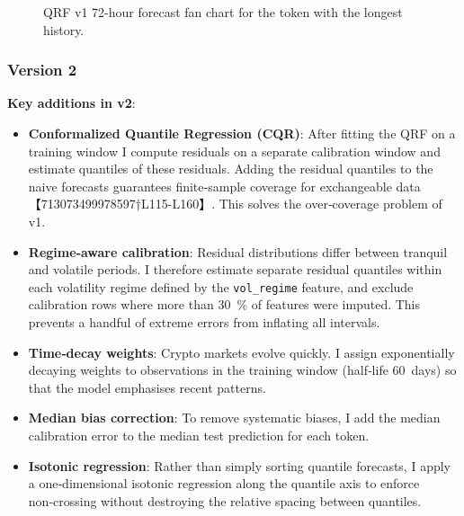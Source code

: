 \documentclass[
  a4paper,
  DIV=11,
  numbers=noendperiod]{scrreprt}
\providecommand{\tightlist}{%
  \setlength{\itemsep}{0pt}\setlength{\parskip}{0pt}}
\begin{document}
\begin{figure}


\caption{\label{fig-qrf-fan-longest}QRF v1 72-hour forecast fan chart
for the token with the longest history.}

\end{figure}%

\subsubsection{Version 2}\label{version-2}

\textbf{Key additions in v2}:

\begin{itemize}
\tightlist
\item
  \textbf{Conformalized Quantile Regression (CQR)}: After fitting the
  QRF on a training window I compute residuals on a separate calibration
  window and estimate quantiles of these residuals. Adding the residual
  quantiles to the naive forecasts guarantees finite‑sample coverage for
  exchangeable data【713073499978597†L115-L160】. This solves the
  over‑coverage problem of v1.
\item
  \textbf{Regime‑aware calibration}: Residual distributions differ
  between tranquil and volatile periods. I therefore estimate separate
  residual quantiles within each volatility regime defined by the
  \texttt{vol\_regime} feature, and exclude calibration rows where more
  than 30~\% of features were imputed. This prevents a handful of
  extreme errors from inflating all intervals.
\item
  \textbf{Time‑decay weights}: Crypto markets evolve quickly. I assign
  exponentially decaying weights to observations in the training window
  (half‑life 60~days) so that the model emphasises recent patterns.
\item
  \textbf{Median bias correction}: To remove systematic biases, I add
  the median calibration error to the median test prediction for each
  token.
\item
  \textbf{Isotonic regression}: Rather than simply sorting quantile
  forecasts, I apply a one‑dimensional isotonic regression along the
  quantile axis to enforce non‑crossing without destroying the relative
  spacing between quantiles.
\end{itemize}
\end{document}
